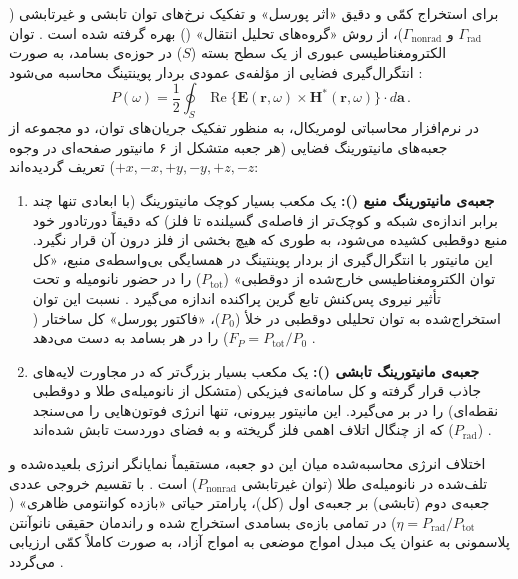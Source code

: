 \documentclass[12pt,a4paper]{report}
\newcommand{\sub}[1]{\mathrm{#1}}               %
\newcommand{\Real}{\operatorname{Re}}
\begin{document}
برای استخراج کمّی و دقیق «اثر پورسل» و تفکیک نرخ‌های توان تابشی و غیرتابشی ($\Gamma_{\sub{rad}}$ و $\Gamma_{\sub{nonrad}}$)، از روش «گروه‌های تحلیل انتقال» () بهره گرفته شده است \cite{novotny}. توان الکترومغناطیسی عبوری از یک سطح بسته ($S$) در حوزه‌ی بسامد، به صورت انتگرال‌گیری فضایی از مؤلفه‌ی عمودی بردار پوینتینگ محاسبه می‌شود \cite{novotny}:
\begin{equation}
P(\omega)=\frac{1}{2}\oint_S\Real\{\mathbf{E}(\mathbf{r},\omega)\times\mathbf{H}^*(\mathbf{r},\omega)\}\cdot d\mathbf{a}\,.
\end{equation}
در نرم‌افزار محاسباتی لومریکال، به منظور تفکیک جریان‌های توان، دو مجموعه از جعبه‌های مانیتورینگ فضایی (هر جعبه متشکل از ۶ مانیتور صفحه‌ای در وجوه $+x,-x,+y,-y,+z,-z$) تعریف گردیده‌اند:
\begin{enumerate}
\item \textbf{جعبه‌ی مانیتورینگ منبع ():} یک مکعب بسیار کوچک مانیتورینگ (با ابعادی تنها چند برابر اندازه‌ی شبکه و کوچک‌تر از فاصله‌ی گسیلنده تا فلز) که دقیقاً دورتادور خود منبع دوقطبی کشیده می‌شود، به طوری که هیچ بخشی از فلز درون آن قرار نگیرد. این مانیتور با انتگرال‌گیری از بردار پوینتینگ در همسایگی بی‌واسطه‌ی منبع، «کل توان الکترومغناطیسی خارج‌شده از دوقطبی» ($P_{\sub{tot}}$) را در حضور نانومیله و تحت تأثیر نیروی پس‌کنش تابع گرین پراکنده اندازه می‌گیرد \cite{novotny}. نسبت این توان استخراج‌شده به توان تحلیلی دوقطبی در خلأ ($P_0$)، «فاکتور پورسل» کل ساختار ($F_P=P_{\sub{tot}}/P_0$) را در هر بسامد به دست می‌دهد \cite{novotny,purcell}.
\item \textbf{جعبه‌ی مانیتورینگ تابشی ():} یک مکعب بسیار بزرگ‌تر که در مجاورت لایه‌های جاذب  قرار گرفته و کل سامانه‌ی فیزیکی (متشکل از نانومیله‌ی طلا و دوقطبی نقطه‌ای) را در بر می‌گیرد. این مانیتور بیرونی، تنها انرژی فوتون‌هایی را می‌سنجد که از چنگال اتلاف اهمی فلز گریخته و به فضای دوردست تابش شده‌اند ($P_{\sub{rad}}$) \cite{novotny,koenderink}.
\end{enumerate}
اختلاف انرژی محاسبه‌شده میان این دو جعبه، مستقیماً نمایانگر انرژی بلعیده‌شده و تلف‌شده در نانومیله‌ی طلا (توان غیرتابشی $P_{\sub{nonrad}}$) است \cite{novotny}. با تقسیم خروجی عددی جعبه‌ی دوم (تابشی) بر جعبه‌ی اول (کل)، پارامتر حیاتی «بازده کوانتومی ظاهری» ($\eta=P_{\sub{rad}}/P_{\sub{tot}}$) در تمامی بازه‌ی بسامدی استخراج شده و راندمان حقیقی نانوآنتن پلاسمونی به عنوان یک مبدل امواج موضعی به امواج آزاد، به صورت کاملاً کمّی ارزیابی می‌گردد \cite{novotny,maier}.

\end{document}
